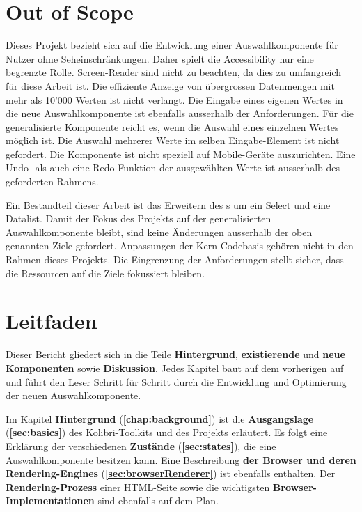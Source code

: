 \section{Out of Scope}
\label{sec:outOfScope}

Dieses Projekt bezieht sich auf die Entwicklung einer Auswahlkomponente für Nutzer ohne Seheinschränkungen. 
Daher spielt die Accessibility nur eine begrenzte Rolle. 
Screen-Reader sind nicht zu beachten, da dies zu umfangreich für diese Arbeit ist. 
Die effiziente Anzeige von übergrossen Datenmengen mit mehr als 10'000 Werten ist nicht verlangt. 
Die Eingabe eines eigenen Wertes in die neue Auswahlkomponente ist ebenfalls ausserhalb der Anforderungen. 
Für die generalisierte Komponente reicht es, wenn die Auswahl eines einzelnen Wertes möglich ist. 
Die Auswahl mehrerer Werte im selben Eingabe-Element ist nicht gefordert. 
Die Komponente ist nicht speziell auf Mobile-Geräte auszurichten. 
Eine Undo- als auch eine Redo-Funktion der ausgewählten Werte ist ausserhalb des geforderten Rahmens. 

Ein Bestandteil dieser Arbeit ist das Erweitern des s um ein Select und eine Datalist. 
Damit der Fokus des Projekts auf der generalisierten Auswahlkomponente bleibt, sind keine Änderungen ausserhalb der oben genannten Ziele gefordert. 
Anpassungen der Kern-Codebasis gehören nicht in den Rahmen dieses Projekts. 
Die Eingrenzung der Anforderungen stellt sicher, dass die Ressourcen auf die Ziele fokussiert bleiben. 


\section{Leitfaden}
\label{sec:tocTexted}

Dieser Bericht gliedert sich in die Teile \textbf{Hintergrund}, \textbf{existierende} und \textbf{neue Komponenten} sowie \textbf{Diskussion}. 
Jedes Kapitel baut auf dem vorherigen auf und führt den Leser Schritt für Schritt durch die Entwicklung und Optimierung der neuen Auswahlkomponente. 

Im Kapitel \textbf{Hintergrund} (\textbf{\ref{chap:background}}) ist die \textbf{Ausgangslage} (\textbf{\ref{sec:basics}}) des Kolibri-Toolkits und des Projekts erläutert. 
Es folgt eine Erklärung der verschiedenen \textbf{Zustände} (\textbf{\ref{sec:states}}), die eine Auswahlkomponente besitzen kann. 
Eine Beschreibung \textbf{der Browser und deren Rendering-Engines} (\textbf{\ref{sec:browserRenderer}}) ist ebenfalls enthalten. 
Der \textbf{Rendering-Prozess} einer HTML-Seite sowie die wichtigsten \textbf{Browser-Implementationen} sind ebenfalls auf dem Plan. 

